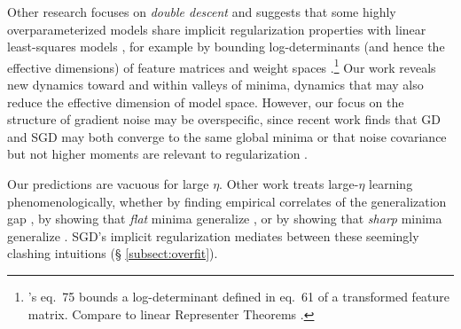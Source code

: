 \documentclass[anon,12pt]{colt2021} %
\begin{document}
            Other research focuses on \emph{double descent} and suggests that
            some highly overparameterized models share implicit regularization
            properties with linear least-squares models \citep{be19}, for
            example by bounding log-determinants (and hence the effective
            dimensions) of feature matrices and weight spaces
            \citep{me20}.\footnote{
                \cite{me20}'s eq.\ 75 bounds a log-determinant defined in eq.\
                61 of a transformed feature matrix.  Compare to linear
                Representer Theorems \citep{mo18b}.
            }
            Our work reveals new dynamics toward and within valleys of minima,
            dynamics that may also reduce the effective dimension of model space.
            However, our focus on the structure of gradient noise may be
            overspecific, since recent work finds that GD and SGD may both
            converge to the same global minima \citep{zo20} or that
            noise covariance but not higher moments are relevant to
            regularization \citep{wu20}. 

        
            Our predictions are vacuous for large $\eta$.  Other work treats
            large-$\eta$ learning phenomenologically, whether by finding
            empirical correlates of the generalization gap \citep{li18}, by
            showing that \emph{flat} minima generalize \citep{ho17,ke17,wa18},
            or by showing that \emph{sharp} minima generalize
            \citep{st56,di17,wu18}.  SGD's implicit regularization mediates
            between these seemingly clashing intuitions (\S
            \ref{subsect:overfit}).
            
        
\end{document}
